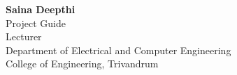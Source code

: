 \vspace{-\parskip}
\begingroup
\singlespacing
\begin{flushright}
\textbf{Saina Deepthi}               \\
Project Guide                        \\
Lecturer                             \\
Department of Electrical and Computer Engineering  \\
College of Engineering, Trivandrum \\
\end{flushright}
\endgroup
\par
